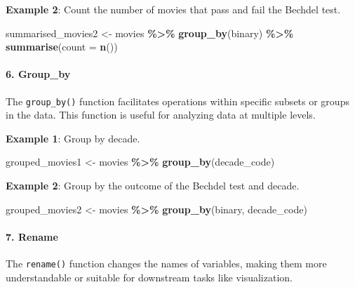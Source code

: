 \documentclass[
  b5paper]{book}
\newenvironment{Shaded}{\begin{snugshade}}{\end{snugshade}}
\newcommand{\AttributeTok}[1]{\textcolor[rgb]{0.13,0.29,0.53}{#1}}
\newcommand{\FunctionTok}[1]{\textcolor[rgb]{0.13,0.29,0.53}{\textbf{#1}}}
\newcommand{\NormalTok}[1]{#1}
\newcommand{\OtherTok}[1]{\textcolor[rgb]{0.56,0.35,0.01}{#1}}
\newcommand{\SpecialCharTok}[1]{\textcolor[rgb]{0.81,0.36,0.00}{\textbf{#1}}}
\begin{document}
\textbf{Example 2}: Count the number of movies that pass and fail the Bechdel test.

\begin{Shaded}
\begin{Highlighting}[]
\NormalTok{summarised\_movies2 }\OtherTok{\textless{}{-}}\NormalTok{ movies }\SpecialCharTok{\%\textgreater{}\%}
  \FunctionTok{group\_by}\NormalTok{(binary) }\SpecialCharTok{\%\textgreater{}\%}
  \FunctionTok{summarise}\NormalTok{(}\AttributeTok{count =} \FunctionTok{n}\NormalTok{())}
\end{Highlighting}
\end{Shaded}

\hypertarget{group_by}{%
\paragraph*{6. Group\_by}\label{group_by}}

The \texttt{group\_by()} function facilitates operations within specific subsets or groups in the data. This function is useful for analyzing data at multiple levels.

\textbf{Example 1}: Group by decade.

\begin{Shaded}
\begin{Highlighting}[]
\NormalTok{grouped\_movies1 }\OtherTok{\textless{}{-}}\NormalTok{ movies }\SpecialCharTok{\%\textgreater{}\%}
  \FunctionTok{group\_by}\NormalTok{(decade\_code)}
\end{Highlighting}
\end{Shaded}

\textbf{Example 2}: Group by the outcome of the Bechdel test and decade.

\begin{Shaded}
\begin{Highlighting}[]
\NormalTok{grouped\_movies2 }\OtherTok{\textless{}{-}}\NormalTok{ movies }\SpecialCharTok{\%\textgreater{}\%}
  \FunctionTok{group\_by}\NormalTok{(binary, decade\_code)}
\end{Highlighting}
\end{Shaded}

\hypertarget{rename}{%
\paragraph*{7. Rename}\label{rename}}

The \texttt{rename()} function changes the names of variables, making them more understandable or suitable for downstream tasks like visualization.
\end{document}
